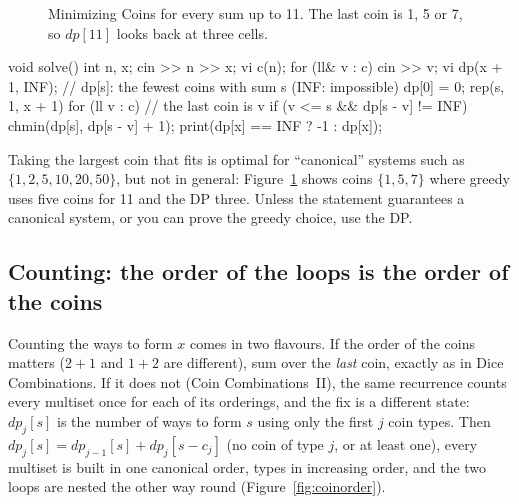 \begin{figure}[htbp]
\centering
{}
\caption{Minimizing Coins for every sum up to 11. The last coin is 1, 5 or 7, so $dp[11]$ looks back at three cells.}
\label{fig:mincoins}
\end{figure}

\begin{code}
void solve() {
    int n, x;
    cin >> n >> x;
    vi c(n);
    for (ll& v : c) cin >> v;
    vi dp(x + 1, INF);  // dp[s]: the fewest coins with sum s (INF: impossible)
    dp[0] = 0;
    rep(s, 1, x + 1) for (ll v : c)  // the last coin is v
        if (v <= s && dp[s - v] != INF) chmin(dp[s], dp[s - v] + 1);
    print(dp[x] == INF ? -1 : dp[x]);
}
\end{code}

\begin{pitfall}
Taking the largest coin that fits is optimal for ``canonical'' systems such as $\{1, 2, 5, 10, 20, 50\}$, but not in general:
Figure~\ref{fig:mincoins} shows coins $\{1, 5, 7\}$ where greedy uses five coins for 11 and the DP three. Unless the statement
guarantees a canonical system, or you can prove the greedy choice, use the DP.
\end{pitfall}

\subsection{Counting: the order of the loops is the order of the coins}

Counting the ways to form $x$ comes in two flavours. If the order of the coins matters ($2 + 1$ and $1 + 2$ are different), sum over
the \emph{last} coin, exactly as in Dice Combinations. If it does not (Coin Combinations~II), the same recurrence counts every
multiset once for each of its orderings, and the fix is a different state: $dp_j[s]$ is the number of ways to form $s$ using only
the first $j$ coin types. Then $dp_j[s] = dp_{j-1}[s] + dp_j[s - c_j]$ (no coin of type $j$, or at least one), every multiset is
built in one canonical order, types in increasing order, and the two loops are nested the other way round (Figure~\ref{fig:coinorder}).

